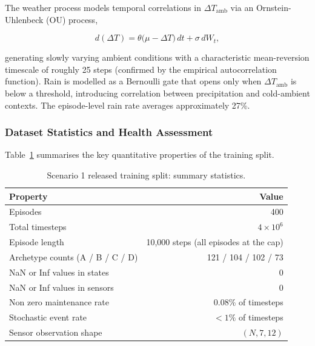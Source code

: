The weather process models temporal correlations in $\Delta T_\mathrm{amb}$
via an Ornstein-Uhlenbeck (OU) process,

\begin{equation}
  d(\Delta T) = \theta \bigl(\mu - \Delta T\bigr)\, dt + \sigma\, dW_t,
\end{equation}

generating slowly varying ambient conditions with a characteristic
mean-reversion timescale of roughly 25 steps (confirmed by the empirical
autocorrelation function). Rain is modelled as a Bernoulli gate that
opens only when $\Delta T_\mathrm{amb}$ is below a threshold,
introducing correlation between precipitation and cold-ambient contexts.
The episode-level rain rate averages approximately 27\%.

\subsubsection{Dataset Statistics and Health Assessment}
\label{sec:dataset_stats}

Table~\ref{tab:dataset_summary} summarises the key quantitative properties
of the training split.

\begin{table}[h]
\centering
\caption{Scenario 1 released training split: summary statistics.}
\label{tab:dataset_summary}
\small
\begin{tabular}{lr}
\toprule
Property & Value \\
\midrule
Episodes                         & 400 \\
Total timesteps                  & $4 \times 10^6$ \\
Episode length                   & 10{,}000 steps (all episodes at the cap) \\
Archetype counts (A / B / C / D) & 121 / 104 / 102 / 73 \\
NaN or Inf values in states      & 0 \\
NaN or Inf values in sensors     & 0 \\
Non zero maintenance rate        & 0.08\% of timesteps \\
Stochastic event rate            & ${<}1\%$ of timesteps \\
Sensor observation shape         & $(N, 7, 12)$ \\
\bottomrule
\end{tabular}
\end{table}

